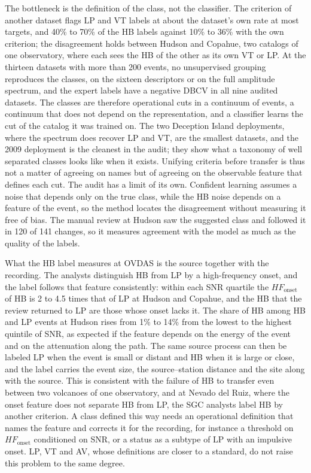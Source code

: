\documentclass[pdflatex,sn-mathphys-num]{sn-jnl}
\begin{document}
The bottleneck is the definition of the class, not the classifier. The
criterion of another dataset flags LP and VT labels at about the dataset's
own rate at most targets, and 40\% to 70\% of the HB labels against 10\% to
36\% with the own criterion;
the disagreement holds between Hudson and Copahue, two catalogs of one
observatory, where each sees the HB of the other as its own VT or LP. At the thirteen datasets with more than 200 events, no unsupervised grouping
reproduces the classes, on the sixteen descriptors or on the full amplitude
spectrum, and the expert labels have a negative DBCV in all nine audited
datasets. The classes are therefore operational cuts in a
continuum of events, a continuum that does not depend on the
representation, and a classifier learns the cut of the catalog it was
trained on. The two Deception Island deployments, where the spectrum does
recover LP and VT, are the smallest datasets, and the 2009 deployment is the
cleanest in the audit;
they show what a taxonomy of well separated classes looks like when it
exists. Unifying criteria before transfer is thus not a matter of agreeing
on names but of agreeing on the observable feature that defines each cut.
The audit has a limit of its own. Confident learning assumes a noise that
depends only on the true class, while the HB noise depends on a feature of
the event, so the method locates the disagreement without measuring it free
of bias. The manual review at Hudson saw the suggested class and followed
it in 120 of 141 changes, so it measures agreement with the model as much
as the quality of the labels.

What the HB label measures at OVDAS is the source together with the
recording. The analysts distinguish HB from LP by a high-frequency onset, and the
label follows that feature consistently: within each SNR quartile the
$HF_{\text{onset}}$ of HB is 2 to 4.5 times that of LP at Hudson and
Copahue, and the HB that the review returned to LP are those whose onset
lacks it. The share of HB among HB and LP events at Hudson rises from 1\% to 14\%
from the lowest to the highest quintile of SNR, as expected if the feature
depends on the energy of the event and on the attenuation along the path.
The same source process can then be labeled LP when the event is small or
distant and HB when it is large or close, and the label carries the event
size, the source--station distance and the site along with the source. This
is consistent with the failure of HB to transfer even between two volcanoes
of one observatory, and at Nevado del Ruiz, where the onset feature does not
separate HB from LP, the SGC analysts label HB by another criterion. A class defined this way needs an operational
definition that names the feature and corrects it for the recording, for
instance a threshold on $HF_{\text{onset}}$ conditioned on SNR, or a status
as a subtype of LP with an impulsive onset. LP, VT and AV, whose
definitions are closer to a standard, do not raise this problem to the same
degree.
\end{document}
